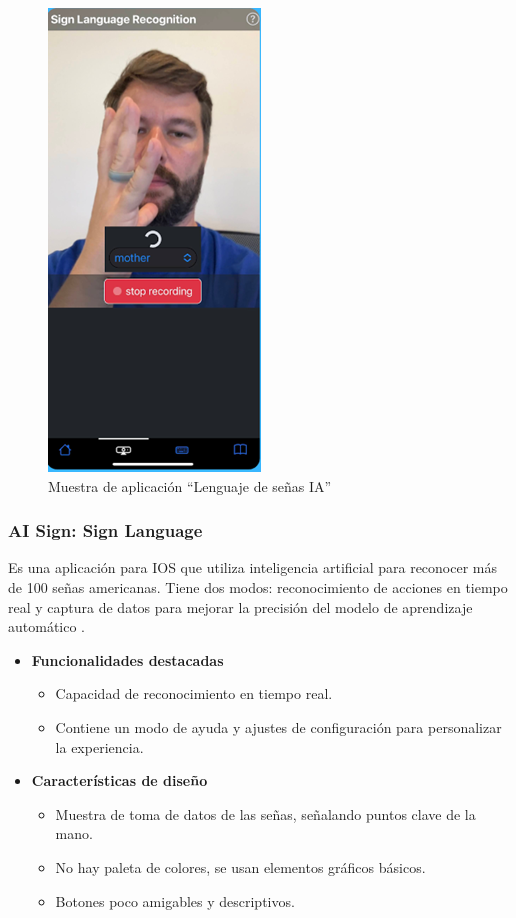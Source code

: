 \begin{figure}[H]
    \centering
    \includegraphics[width=0.2\linewidth]{figuras/applenguasenasia.png}
    \caption{Muestra de aplicación “Lenguaje de señas IA”}
    \label{fig:enter-label}
\end{figure}

\subsubsection{AI Sign: Sign Language}

Es una aplicación para IOS que utiliza inteligencia artificial para reconocer más de 100 señas americanas. Tiene dos modos: reconocimiento de acciones en tiempo real y captura de datos para mejorar la precisión del modelo de aprendizaje automático \cite{AISign2023}.

\begin{itemize}
    \item \textbf{Funcionalidades destacadas}
    \begin{itemize}
        \item Capacidad de reconocimiento en tiempo real.
        \item Contiene un modo de ayuda y ajustes de configuración para personalizar la experiencia.
    \end{itemize}

    \item \textbf{Características de diseño}
    \begin{itemize}
        \item Muestra de toma de datos de las señas, señalando puntos clave de la mano.
        \item No hay paleta de colores, se usan elementos gráficos básicos.
        \item Botones poco amigables y descriptivos.
    \end{itemize}
\end{itemize}


